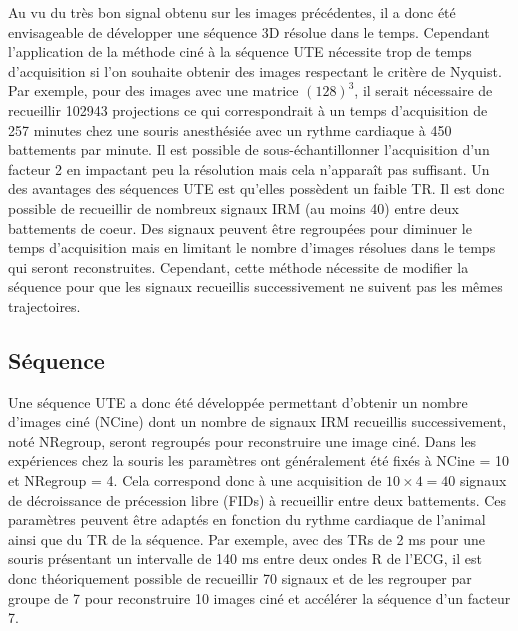 Au vu du très bon signal obtenu sur les images précédentes, il a donc été envisageable de développer une séquence 3D résolue dans le temps. Cependant l'application de la méthode ciné à la séquence UTE nécessite trop de temps d'acquisition si l'on souhaite obtenir des images respectant le critère de Nyquist. Par exemple, pour des images avec une matrice $(128)^3$, il serait nécessaire de recueillir 102943 projections ce qui correspondrait à un temps d'acquisition de 257 minutes chez une souris anesthésiée avec un rythme cardiaque à 450 battements par minute. Il est possible de sous-échantillonner l'acquisition d'un facteur 2 en impactant peu la résolution mais cela n'apparaît pas suffisant.
Un des avantages des séquences UTE est qu'elles possèdent un faible TR. Il est donc possible de recueillir de nombreux signaux IRM (au moins 40) entre deux battements de coeur. Des signaux peuvent être regroupées pour diminuer le temps d'acquisition mais en limitant le nombre d'images résolues dans le temps qui seront reconstruites. 
Cependant, cette méthode nécessite de modifier la séquence pour que les signaux recueillis successivement ne suivent pas les mêmes trajectoires.


\subsection{Séquence}

Une séquence UTE a donc été développée permettant d'obtenir un nombre d'images ciné (NCine) dont un nombre de signaux IRM recueillis successivement, noté NRegroup, seront regroupés pour reconstruire une image ciné. Dans les expériences chez la souris les paramètres ont généralement été fixés à NCine = 10 et NRegroup = 4. Cela correspond donc à une acquisition de $10 \times 4 = 40$ signaux de décroissance de précession libre (FIDs) à recueillir entre deux battements. Ces paramètres peuvent être adaptés en fonction du rythme cardiaque de l'animal ainsi que du TR de la séquence. Par exemple, avec des TRs de 2 ms pour une souris présentant un intervalle de 140 ms entre deux ondes R de l'ECG, il est donc théoriquement possible de recueillir 70 signaux et de les regrouper par groupe de 7 pour reconstruire 10 images ciné et accélérer la séquence d'un facteur 7.

